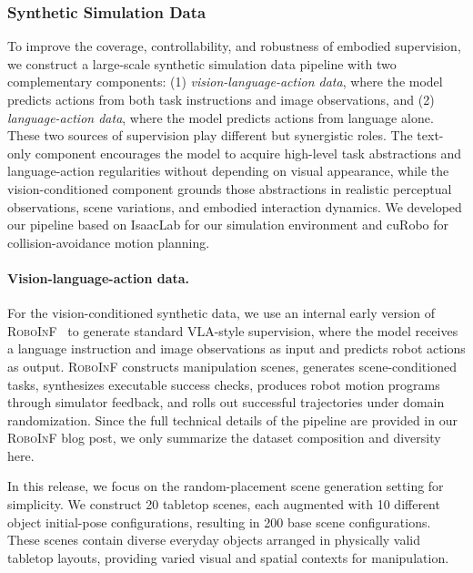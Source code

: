 \documentclass{article}
\begin{document}
\subsubsection{Synthetic Simulation Data}
\label{subsubsection:SyntheticSimulationData}
To improve the coverage, controllability, and robustness of embodied supervision, we construct a large-scale synthetic simulation data pipeline with two complementary components: (1) \emph{vision-language-action data}, where the model predicts actions from both task instructions and image observations, and (2) \emph{language-action data}, where the model predicts actions from language alone. These two sources of supervision play different but synergistic roles. The text-only component encourages the model to acquire high-level task abstractions and language-action regularities without depending on visual appearance, while the vision-conditioned component grounds those abstractions in realistic perceptual observations, scene variations, and embodied interaction dynamics. We developed our pipeline based on IsaacLab \citep{mittal2025isaaclab} for our simulation environment and cuRobo \citep{sundaralingam2023curoboparallelizedcollisionfreeminimumjerk} for collision-avoidance motion planning.

\paragraph{Vision-language-action data.}
For the vision-conditioned synthetic data, we use an internal early version of \textsc{RoboInF}~\citep{roboinf} to generate standard VLA-style supervision, where the model receives a language instruction and image observations as input and predicts robot actions as output. \textsc{RoboInF} constructs manipulation scenes, generates scene-conditioned tasks, synthesizes executable success checks, produces robot motion programs through simulator feedback, and rolls out successful trajectories under domain randomization. Since the full technical details of the pipeline are provided in our \textsc{RoboInF} blog post, we only summarize the dataset composition and diversity here.

In this release, we focus on the random-placement scene generation setting for simplicity. We construct 20 tabletop scenes, each augmented with 10 different object initial-pose configurations, resulting in 200 base scene configurations. These scenes contain diverse everyday objects arranged in physically valid tabletop layouts, providing varied visual and spatial contexts for manipulation.
\end{document}
